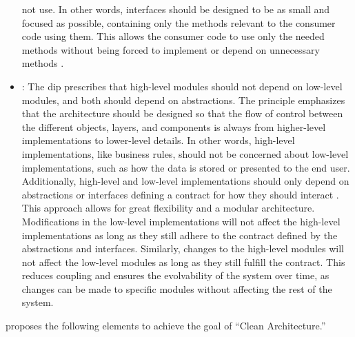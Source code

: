 \begin{itemize}
    not use. In other words, interfaces should be designed to be as small and focused as
    possible, containing only the methods relevant to the consumer code using them. This
    allows the consumer code to use only the needed methods without being forced to
    implement or depend on unnecessary methods
    \parencite[104]{r_c_martin_clean_2018}. 
    \item {}: The \gls{dip} prescribes that high-level modules should not
    depend on low-level modules, and both should depend on abstractions. The principle
    emphasizes that the architecture should be designed so that the flow of control
    between the different objects, layers, and components is always from higher-level
    implementations to lower-level details. In other words, high-level implementations,
    like business rules, should not be concerned about low-level implementations, such as
    how the data is stored or presented to the end user. Additionally, high-level and
    low-level implementations should only depend on abstractions or interfaces defining a
    contract for how they should interact \parencite[91]{r_c_martin_clean_2018}. This
    approach allows for great flexibility and a modular architecture. Modifications in the
    low-level implementations will not affect the high-level implementations as long as
    they still adhere to the contract defined by the abstractions and interfaces.
    Similarly, changes to the high-level modules will not affect the low-level modules as
    long as they still fulfill the contract. This reduces coupling and ensures the
    evolvability of the system over time, as changes can be made to specific modules
    without affecting the rest of the system.
\end{itemize}

\textcite{r_c_martin_clean_2018} proposes the following elements to achieve
the goal of \enquote{Clean Architecture.}

